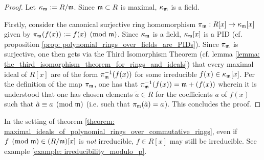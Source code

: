             \begin{proof}
                Let $\kappa_{\mathfrak{m}} := R/\mathfrak{m}$. Since $\mathfrak{m} \subset R$ is maximal, $\kappa_{\mathfrak{m}}$ is a field. 
            
                Firstly, consider the canonical surjective ring homomorphism $\pi_{\mathfrak{m}}: R[x] \to \kappa_{\mathfrak{m}}[x]$ given by $\pi_{\mathfrak{m}}(f(x)) := f(x) \pmod{\mathfrak{m}}$. Since $\kappa_{\mathfrak{m}}$ is a field, $\kappa_{\mathfrak{m}}[x]$ is a PID (cf. proposition \ref{prop: polynomial_rings_over_fields_are_PIDs}). Since $\pi_{\mathfrak{m}}$ is surjective, one then gets via the Third Isomorphism Theorem (cf. lemma \ref{lemma: the_third_isomorphism_theorem_for_rings_and_ideals}) that every maximal ideal of $R[x]$ are of the form $\pi_{\mathfrak{m}}^{-1}(f(x))$ for some irreducible $f(x) \in \kappa_{\mathfrak{m}}[x]$. Per the definition of the map $\pi_{\mathfrak{m}}$, one has that $\pi_{\mathfrak{m}}^{-1}(f(x)) = \mathfrak{m} + (f(x))$ wherein it is understood that one has chosen elements $\tilde{a} \in R$ for the coefficients $a$ of $f(x)$ such that $\tilde{a} \equiv a \pmod{\mathfrak{m}}$ (i.e. such that $\pi_{\mathfrak{m}}(\tilde{a}) = a$). This concludes the proof. 
            \end{proof}
        \begin{remark}
            In the setting of theorem \ref{theorem: maximal_ideals_of_polynomial_rings_over_commutative_rings}, even if $f \pmod{\mathfrak{m}} \in (R/\mathfrak{m})[x]$ is \textit{not} irreducible, $f \in R[x]$ may still be irreducible. See example \ref{example: irreducibility_modulo_p}.
        \end{remark}
        
